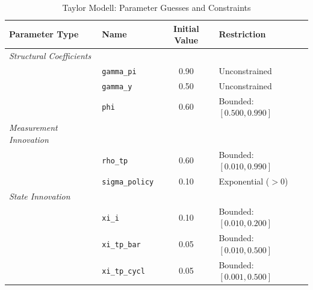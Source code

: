 \begin{table}[htbp]
\centering
\caption{Taylor Modell: Parameter Guesses and Constraints}
\label{tab:taylor_model_ssm_specs}
\begin{tabular}{llcl}
\hline\hline
\textbf{Parameter Type} & \textbf{Name} & \textbf{Initial Value} & \textbf{Restriction} \\ \hline
\textit{Structural Coefficients} &&& \\
    & \texttt{gamma\_pi} & 0.90 & Unconstrained \\
    & \texttt{gamma\_y} & 0.50 & Unconstrained \\
    & \texttt{phi} & 0.60 & Bounded: $[0.500, 0.990]$ \\
\hline
\textit{Measurement Innovation} &&& \\
    & \texttt{rho\_tp} & 0.60 & Bounded: $[0.010, 0.990]$ \\
    & \texttt{sigma\_policy} & 0.10 & Exponential ($>0$) \\
\hline
\textit{State Innovation} &&& \\
    & \texttt{xi\_i} & 0.10 & Bounded: $[0.010, 0.200]$ \\
    & \texttt{xi\_tp\_bar} & 0.05 & Bounded: $[0.010, 0.500]$ \\
    & \texttt{xi\_tp\_cycl} & 0.05 & Bounded: $[0.001, 0.500]$ \\
\hline\hline
\end{tabular}
\end{table}

